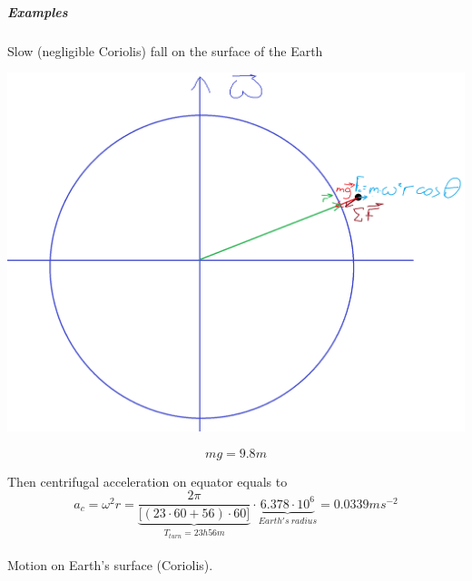 \subparagraph{Examples}

\paragraph{}
Slow (negligible Coriolis) fall on the surface of the Earth


\begin{center}
	\includegraphics[width=\linewidth]{./lect8/pic1.png}
\end{center}

$$mg = 9.8m$$

Then centrifugal acceleration on equator equals to
$$a_c = \omega^2 r = \underbrace{\frac{2\pi}{\big[ (23 \cdot 60 +56) \cdot 60 \big]}}_{T_{turn}= 23 h 56 m} \cdot \underbrace{6.378 \cdot 10^6}_{Earth's \: radius} = 0.0339 ms^{-2}$$

\paragraph{}
Motion on Earth's surface (Coriolis).

